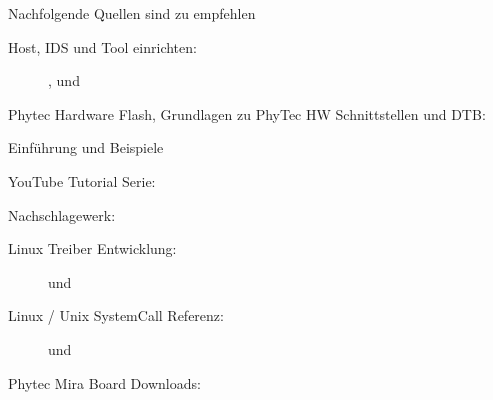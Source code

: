 Nachfolgende Quellen sind zu empfehlen

\begin{description}
    \item[Host, IDS und Tool einrichten:] \cite{PhyTec:Development_Guid},
        \cite{Yocto_Eclipse_Plugin} und    \cite{Gonzalez2018:Embedded_Linux_Development_Using_Yocto_Project_Cookbook_2nd}
    \item[Phytec Hardware Flash,  Grundlagen zu PhyTec HW Schnittstellen und
        \gls{DTB}:] \cite[Kapitel
        \textit{Booting\_the\_System} und
        \textit{Updating\_the\_System}][]{
            Pytec:BSP_Manual}
    \item[Einführung und Beispiele] \cite{Gonzalez2018:Embedded_Linux_Development_Using_Yocto_Project_Cookbook_2nd}
    \item[YouTube Tutorial Serie:] \cite[Live Coding with Yocto
        Project][]{Yocto:YouTube}
    \item[Nachschlagewerk:]\cite{Yocto:Mega_Manual}
    \item[Linux Treiber Entwicklung:] \cite{Quade2015} und \cite{Corbet2005}
    \item[Linux / Unix SystemCall Referenz:] \cite{Kerrisk2010} und \cite{Rago2013}
    \item[Phytec Mira Board Downloads:] \cite{PhyTec:Mira_Downloads}

\end{description}













